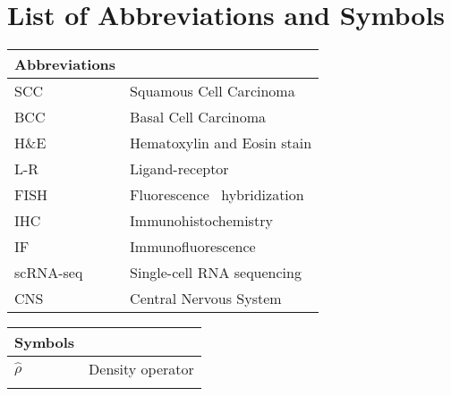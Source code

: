 %

\chapter[List of Abbreviations and Symbols]{List of Abbreviations and Symbols}


\begin{center}
	\small
	\begin{longtable}{ll}
	\toprule
	Abbreviations & {} \\
	\bottomrule
	SCC				& Squamous Cell Carcinoma \\
	BCC				& Basal Cell Carcinoma \\
	H\&E			& Hematoxylin and Eosin stain \\
	L-R             & Ligand-receptor \\
	FISH            & Fluorescence \situ~hybridization \\
	IHC             & Immunohistochemistry \\
	IF              & Immunofluorescence \\
	scRNA-seq       & Single-cell RNA sequencing \\
	CNS             & Central Nervous System \\
	\hline
	\end{longtable}
\end{center}

\begin{center}
	\small
	\begin{longtable}{ll}
	\toprule
	Symbols & {} \\
	\bottomrule
	$\hat{\rho}$		& Density operator \\
	\etc{}					& \etc{} \\
	\hline
	\end{longtable}
\end{center}

